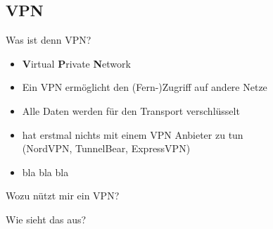 \subsection{VPN}
\begin{frame}{Was ist denn VPN?}
    \large
    \begin{itemize}
        \item \textbf{V}irtual \textbf{P}rivate \textbf{N}etwork
        \item Ein VPN ermöglicht den (Fern-)Zugriff auf andere Netze
        \item Alle Daten werden für den Transport verschlüsselt
        \item hat erstmal nichts mit einem VPN Anbieter zu tun \\
              (NordVPN, TunnelBear, ExpressVPN)
        \item bla bla bla
    \end{itemize}
\end{frame}

\begin{frame}{Wozu nützt mir ein VPN?}
\end{frame}

\begin{frame}{Wie sieht das aus?}
    \begin{center}
    \end{center}
\end{frame}

